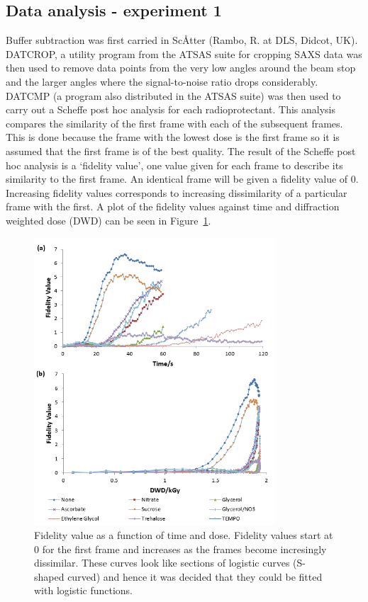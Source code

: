 \subsection{Data analysis - experiment 1}
\label{sub:Data analysis - experiment 1}
Buffer subtraction was first carried in Sc\AA tter (Rambo, R. at DLS, Didcot, UK).
DATCROP, a utility program from the ATSAS suite \cite{petoukhov2012new} for cropping SAXS data was then used to remove data points from the very low angles around the beam stop and the larger angles where the signal-to-noise ratio drops considerably.
DATCMP (a program also distributed in the ATSAS suite) was then used to carry out a Scheffe post hoc analysis for each radioprotectant.
This analysis compares the similarity of the first frame with each of the subsequent frames.
This is done because the frame with the lowest dose is the first frame so it is assumed that the first frame is of the best quality.
The result of the Scheffe post hoc analysis is a ‘fidelity value’, one value given for each frame to describe its similarity to the first frame.
An identical frame will be given a fidelity value of 0.
Increasing fidelity values corresponds to increasing dissimilarity of a particular frame with the first.
A plot of the fidelity values against time and diffraction weighted dose (DWD) can be seen in Figure~\ref{fig:Rebecca data}.
\begin{figure}
    \centering
    \includegraphics[width=0.8\textwidth]{figures/saxs/rebecca_data.png}
    \caption{Fidelity value as a function of time and dose. Fidelity values start at 0 for the first frame and increases as the frames become incresingly dissimilar. These curves look like sections of logistic curves (S-shaped curved) and hence it was decided that they could be fitted with logistic functions.}
    \label{fig:Rebecca data}
\end{figure}
